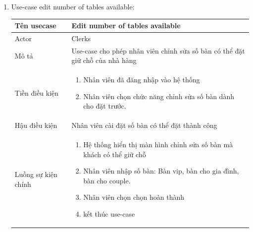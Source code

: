 \begin{enumerate}
    \item Use-case edit number of tables available:
    \begin{center}{\color{black}}
        \begin{tabular}{|p{5cm}|p{7cm}|} \hline
            Tên usecase &   Edit number of tables available\\ \hline
            Actor& Clerks \\ \hline
            Mô tả& Use-case cho phép nhân viên chỉnh sửa số bàn có thể đặt giữ chỗ của nhà hàng\\ \hline
            Tiền điều kiện &
            \begin{enumerate}[1.]
                \item Nhân viên đã đăng nhập vào hệ thống
                \item Nhân viên chọn chức năng chỉnh sửa số bàn dành cho đặt trước.
            \end{enumerate}\\ \hline
            Hậu điều kiện &     Nhân viên cài đặt số bàn có thể đặt thành công \\ \hline
            Luồng sự kiện chính &  
                \begin{enumerate}[1.]
                    \item Hệ thống hiển thị màn hình chỉnh sửa số bàn mà khách có thể giữ chỗ
                    \item Nhân viên nhập số bàn: Bàn vip, bàn cho gia đình, bàn cho couple. 
                    \item Nhân viên chọn chọn hoàn thành
    				\item kết thúc use-case
                \end{enumerate} \\\hline
        \end{tabular}
    \end{center}
\end{enumerate}